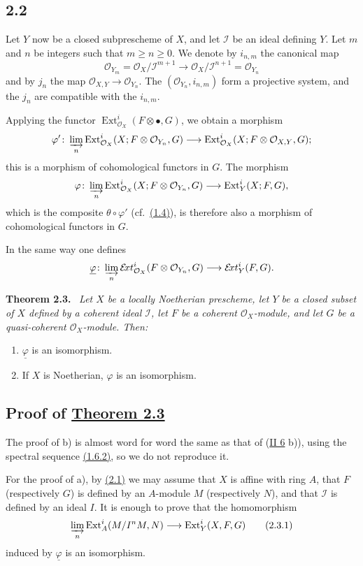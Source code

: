 \documentclass[11pt,a4paper,oneside]{book}
\providecommand{\SheafExt}{\mathcal E\!xt}
\providecommand{\SheafI}{\mathcal I}
\providecommand{\Sheafphi}{\underline{\varphi}}
\providecommand{\OX}{\mathcal O_X}
\providecommand{\OXY}{\mathcal O_{X,Y}}
\providecommand{\OY}[1]{\mathcal O_{Y_{#1}}}
\providecommand{\Ext}{\operatorname{Ext}}
\newenvironment{sgastatement}[1]
  {\par\addvspace{0.8\baselineskip}\noindent\textbf{#1.}\ \itshape}
  {\par\addvspace{0.35\baselineskip}}
\theoremstyle{plain}
\theoremstyle{definition}
\theoremstyle{remark}
\begin{document}
\subsection*{2.2}
Let $Y$ now be a closed subprescheme of $X$, and let $\SheafI$ be an ideal
defining $Y$. Let $m$ and $n$ be integers such that $m\geq n\geq 0$. We
denote by $i_{n,m}$ the canonical map
\[
 \OY{m}=\OX/\SheafI^{m+1}\longrightarrow
 \OX/\SheafI^{n+1}=\OY{n}
\]
and by $j_n$ the map $\OXY\to\OY{n}$. The
$(\OY{n},i_{n,m})$ form a projective system, and the $j_n$ are compatible
with the $i_{n,m}$.

Applying the functor $\Ext_{\OX}^{i}(F\otimes\mathord\bullet,G)$, we obtain a
morphism
\[
 \varphi'\colon
 \varinjlim_n \Ext_{\OX}^{i}(X;F\otimes\OY{n},G)
 \longrightarrow \Ext_{\OX}^{i}(X;F\otimes\OXY,G);
\]
this is a morphism of cohomological functors in $G$. The morphism
\[
 \varphi\colon
 \varinjlim_n \Ext_{\OX}^{i}(X;F\otimes\OY{n},G)
 \longrightarrow \Ext_Y^{i}(X;F,G),
\]
which is the composite $\theta\circ\varphi'$ (cf.~\hyperref[VI.1.4]{(1.4)}), is therefore also a
morphism of cohomological functors in $G$.

In the same way one defines
\[
 \Sheafphi\colon
 \varinjlim_n \SheafExt_{\OX}^{i}(F\otimes\OY{n},G)
 \longrightarrow \SheafExt_Y^{i}(F,G).
\]

\begin{sgastatement}{Theorem 2.3}
Let $X$ be a locally Noetherian prescheme, let $Y$ be a closed subset of $X$
defined by a coherent ideal $\SheafI$, let $F$ be a coherent $\OX$-module,
and let $G$ be a quasi-coherent $\OX$-module. Then:
\begin{enumerate}
 \renewcommand{\labelenumi}{\alph{enumi})}
 \item $\Sheafphi$ is an isomorphism.
 \item If $X$ is Noetherian, $\varphi$ is an isomorphism.
\end{enumerate}
\end{sgastatement}

\subsection*{Proof of \hyperref[VI.2.3]{Theorem 2.3}}
The proof of b) is almost word for word the same as that of
\textup{(\hyperref[II.6]{II 6} b))}, using the spectral sequence \hyperref[VI.1.6.2]{(1.6.2)}, so we do not reproduce
it.

For the proof of a), by \hyperref[VI.2.1]{(2.1)} we may assume that $X$ is affine with ring $A$,
that $F$ (respectively $G$) is defined by an $A$-module $M$ (respectively
$N$), and that $\SheafI$ is defined by an ideal $I$. It is enough to prove
that the homomorphism
\begin{equation}
 \varinjlim_n \Ext_A^i(M/I^nM,N)
 \longrightarrow \Ext_Y^i(X,F,G)
 \tag{2.3.1}\label{VI.2.3.1}
\end{equation}
induced by $\Sheafphi$ is an isomorphism.
\end{document}
